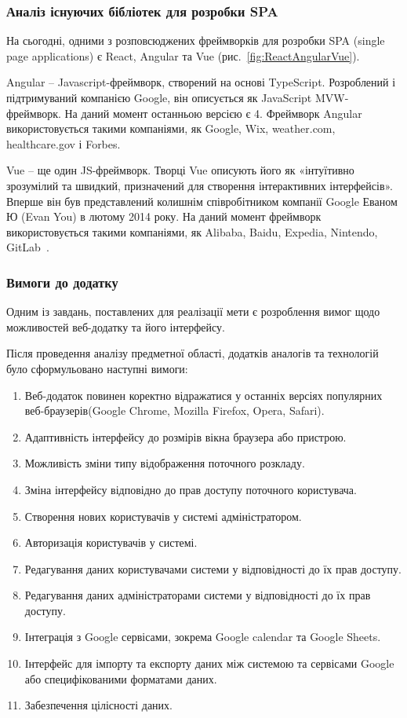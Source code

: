 \subsubsection{Аналіз існуючих бібліотек для розробки SPA}

На сьогодні, одними з розповсюджених фреймворків для розробки SPA (single page applications) є React, Angular та Vue (рис.~\ref{fig:ReactAngularVue}).


Angular -- Javascript-фреймворк, створений на основі TypeScript. Розроблений і підтримуваний компанією Google, він описується як JavaScript MVW-фреймворк. На даний момент останньою версією є 4. Фреймворк Angular використовується такими компаніями, як Google, Wix, weather.com, healthcare.gov і Forbes.

\label{subs:vue}
Vue -- ще один JS-фреймворк. Творці Vue описують його як «інтуїтивно зрозумілий та швидкий, призначений для створення інтерактивних інтерфейсів». Вперше він був представлений колишнім співробітником компанії Google Еваном Ю (Evan You) в лютому 2014 року. На даний момент фреймворк використовується такими компаніями, як Alibaba, Baidu, Expedia, Nintendo, GitLab~\cite{emmitscott2015}.

\subsubsection{Вимоги до додатку}

Одним із завдань, поставлених для реалізації мети є розроблення вимог щодо можливостей веб-додатку та його інтерфейсу.

Після проведення аналізу предметної області, додатків аналогів та технологій було сформульовано наступні вимоги:

\begin{enumerate}
    \item Веб-додаток повинен коректно відражатися у останніх версіях популярних веб-браузерів(Google Chrome, Mozilla Firefox, Opera, Safari).
    \item Адаптивність інтерфейсу до розмірів вікна браузера або пристрою.
    \item Можливість зміни типу відображення поточного розкладу.
    \item Зміна інтерфейсу відповідно до прав доступу поточного користувача.
    \item Створення нових користувачів у системі адміністратором.
    \item Авторизація користувачів у системі.
    \item Редагування даних користувачами системи у відповідності до їх прав доступу.
    \item Редагування даних адміністраторами системи у відповідності до їх прав доступу.
    \item Інтеграція з Google сервісами, зокрема Google calendar та Google Sheets.
    \item Інтерфейс для імпорту та експорту даних між системою та сервісами Google або специфікованими форматами даних.
    \item Забезпечення цілісності даних.
\end{enumerate}


